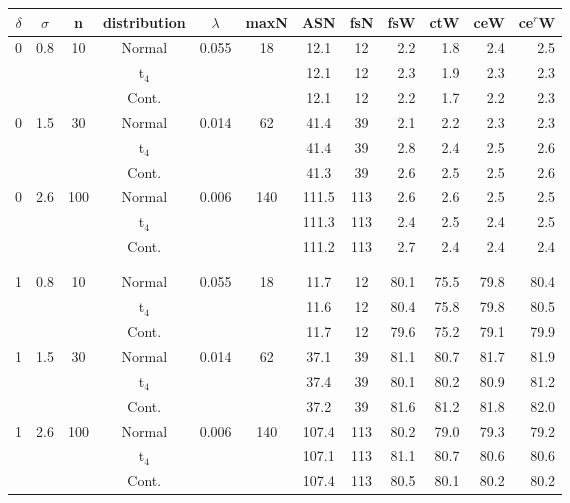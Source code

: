 \begin{tabular}{ccccccccrrrr}

\toprule
\multicolumn{1}{c}{$\delta$}&\multicolumn{1}{c}{$\sigma$}&\multicolumn{1}{c}{n}&\multicolumn{1}{c}{distribution}&\multicolumn{1}{c}{$\lambda$}&\multicolumn{1}{c}{maxN}&\multicolumn{1}{c}{ASN}&\multicolumn{1}{c}{fsN}&\multicolumn{1}{r}{fsW}&\multicolumn{1}{r}{ctW}&\multicolumn{1}{r}{ceW}&\multicolumn{1}{r}{ce$^r$W}\\
\midrule
0  &  0.8  &   10  &  Normal  &  0.055  &   18  &  12.1  &   12  &  2.2  &  1.8  &  2.4  &  2.5\\
   &     &     &  t$_4$  &     &     &  12.1  &   12  &  2.3  &  1.9  &  2.3  &  2.3\\
   &     &     &  Cont.  &     &     &  12.1  &   12  &  2.2  &  1.7  &  2.2  &  2.3\\
0  &  1.5  &   30  &  Normal  &  0.014  &   62  &  41.4  &   39  &  2.1  &  2.2  &  2.3  &  2.3\\
   &     &     &  t$_4$  &     &     &  41.4  &   39  &  2.8  &  2.4  &  2.5  &  2.6\\
   &     &     &  Cont.  &     &     &  41.3  &   39  &  2.6  &  2.5  &  2.5  &  2.6\\
0  &  2.6  &  100  &  Normal  &  0.006  &  140  &  111.5  &  113  &  2.6  &  2.6  &  2.5  &  2.5\\
   &     &     &  t$_4$  &     &     &  111.3  &  113  &  2.4  &  2.5  &  2.4  &  2.5\\
   &     &     &  Cont.  &     &     &  111.2  &  113  &  2.7  &  2.4  &  2.4  &  2.4\\
\\\hline\\ 1  &  0.8  &   10  &  Normal  &  0.055  &   18  &  11.7  &   12  &  80.1  &  75.5  &  79.8  &  80.4\\
   &     &     &  t$_4$  &     &     &  11.6  &   12  &  80.4  &  75.8  &  79.8  &  80.5\\
   &     &     &  Cont.  &     &     &  11.7  &   12  &  79.6  &  75.2  &  79.1  &  79.9\\
1  &  1.5  &   30  &  Normal  &  0.014  &   62  &  37.1  &   39  &  81.1  &  80.7  &  81.7  &  81.9\\
   &     &     &  t$_4$  &     &     &  37.4  &   39  &  80.1  &  80.2  &  80.9  &  81.2\\
   &     &     &  Cont.  &     &     &  37.2  &   39  &  81.6  &  81.2  &  81.8  &  82.0\\
1  &  2.6  &  100  &  Normal  &  0.006  &  140  &  107.4  &  113  &  80.2  &  79.0  &  79.3  &  79.2\\
   &     &     &  t$_4$  &     &     &  107.1  &  113  &  81.1  &  80.7  &  80.6  &  80.6\\
   &     &     &  Cont.  &     &     &  107.4  &  113  &  80.5  &  80.1  &  80.2  &  80.2\\
\bottomrule

\end{tabular}
